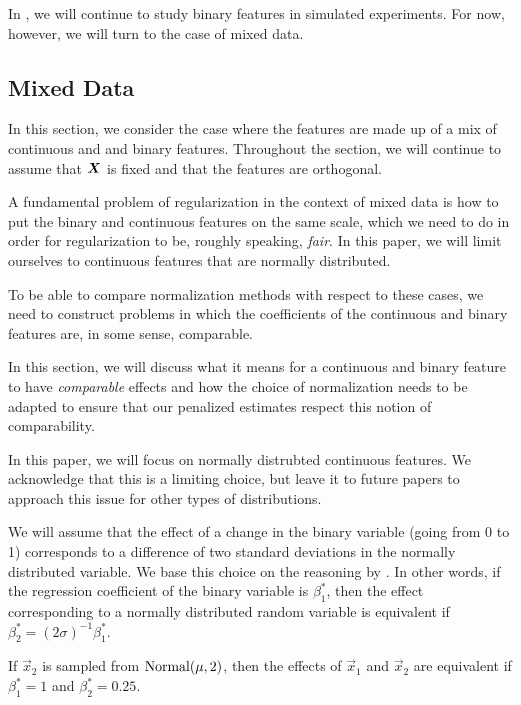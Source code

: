 In , we will continue to study binary features in simulated experiments. For now, however, we will turn to the case of mixed data.

\subsection{Mixed Data}
\label{sec:mixed-data}

In this section, we consider the case where the features are made up of a mix of continuous and and binary features.
Throughout the section, we will continue to assume that \(\boldsymbol{X}\) is fixed and that the features are orthogonal.

A fundamental problem of regularization in the context of mixed data is how to put the binary and continuous features on the same scale, which we need to do in order for regularization to be, roughly speaking, \emph{fair}. In this paper, we will limit ourselves to continuous features that are normally distributed.

To be able to compare normalization methods with respect to these cases, we need to construct problems in which the coefficients of the continuous and binary features are, in some sense, comparable.

In this section, we will discuss what it means for a continuous and binary feature to have \emph{comparable} effects and how the choice of normalization needs to be adapted to ensure that our penalized estimates respect this notion of comparability.

In this paper, we will focus on normally distrubted continuous features. We acknowledge that this is a limiting choice, but leave it to future papers to approach this issue for other types of distributions.

We will assume that the effect of a change in the binary variable (going from 0 to 1) corresponds to a difference of two standard deviations in the normally distributed variable. We base this choice on the reasoning by \citet{gelman2008}. In other words, if the regression coefficient of the binary variable is \(\beta^*_1\), then the effect corresponding to a normally distributed random variable is equivalent if \(\beta^*_2 = (2\sigma)^{-1} \beta_1^*\).

\begin{example}
  If \(\vec{x}_2\) is sampled from \(\operatorname{Normal}(\mu, 2)\), then the effects of \(\vec{x}_1\) and \(\vec{x}_2\) are equivalent if \(\beta_1^* = 1\) and \(\beta_2^* = 0.25\).
\end{example}

